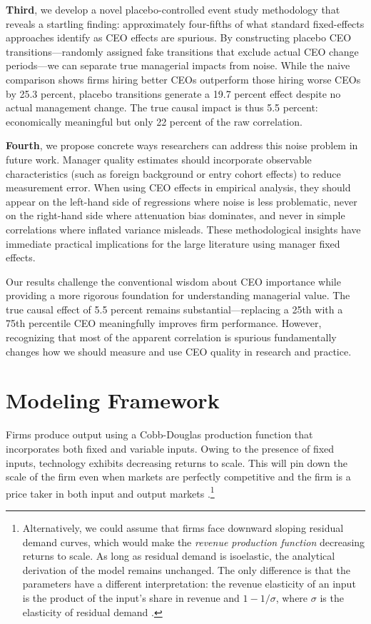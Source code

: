 \documentclass[11pt,a4paper]{article}
\begin{document}
\textbf{Third}, we develop a novel placebo-controlled event study methodology that reveals a startling finding: approximately four-fifths of what standard fixed-effects approaches identify as CEO effects are spurious. By constructing placebo CEO transitions---randomly assigned fake transitions that exclude actual CEO change periods---we can separate true managerial impacts from noise. While the naive comparison shows firms hiring better CEOs outperform those hiring worse CEOs by 25.3 percent, placebo transitions generate a 19.7 percent effect despite no actual management change. The true causal impact is thus 5.5 percent: economically meaningful but only 22 percent of the raw correlation.

\textbf{Fourth}, we propose concrete ways researchers can address this noise problem in future work. Manager quality estimates should incorporate observable characteristics (such as foreign background or entry cohort effects) to reduce measurement error. When using CEO effects in empirical analysis, they should appear on the left-hand side of regressions where noise is less problematic, never on the right-hand side where attenuation bias dominates, and never in simple correlations where inflated variance misleads. These methodological insights have immediate practical implications for the large literature using manager fixed effects.

Our results challenge the conventional wisdom about CEO importance while providing a more rigorous foundation for understanding managerial value. The true causal effect of 5.5 percent remains substantial---replacing a 25th with a 75th percentile CEO meaningfully improves firm performance. However, recognizing that most of the apparent correlation is spurious fundamentally changes how we should measure and use CEO quality in research and practice.


\section{Modeling Framework}
Firms produce output using a Cobb-Douglas production function that incorporates both fixed and variable inputs. Owing to the presence of fixed inputs, technology exhibits decreasing returns to scale. This will pin down the scale of the firm even when markets are perfectly competitive and the firm is a price taker in both input and output markets \citep{AtkesonKehoe2005JPE,McGrattan2012RED}.\footnote{Alternatively, we could assume that firms face downward sloping residual demand curves, which would make the \emph{revenue production function} decreasing returns to scale. As long as residual demand is isoelastic, the analytical derivation of the model remains unchanged. The only difference is that the parameters have a different interpretation: the revenue elasticity of an input is the product of the input's share in revenue and $1-1/\sigma$, where $\sigma$ is the elasticity of residual demand \citep{DeLoecker2011Econometrica}.}
\end{document}
